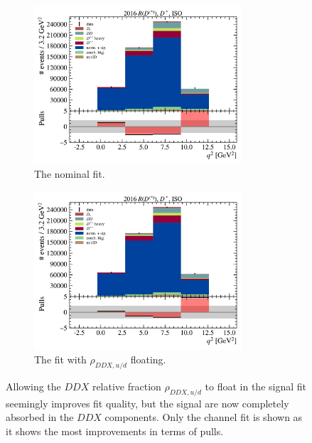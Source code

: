 \begin{figure}[!htb]
    \begin{subfigure}[t]{0.5\textwidth}
        \includegraphics[width=0.85\textwidth]{figs-fit/fit_uvsd/fit_result-stacked-Dst-iso-q2.pdf}
        \caption{The nominal fit.}
    \end{subfigure}%
    \begin{subfigure}[t]{0.5\textwidth}
        \includegraphics[width=0.85\textwidth]{figs-fit/fit_uvsd/fit_result-stacked-Dst-iso-q2-floating_uvsd.pdf}
        \caption{The fit with $\rho_{DDX,u/d}$ floating.}
    \end{subfigure}

    \caption{
        Allowing the $DDX$ relative fraction $\rho_{DDX,u/d}$ to float in the
        signal fit seemingly improves fit quality,
        but the signal are now completely absorbed in the $DDX$ components.
        Only the \Dstar channel fit is shown as it shows the most improvements
        in terms of pulls.
    }
    \label{fig:fit-float-uvsd}
\end{figure}

